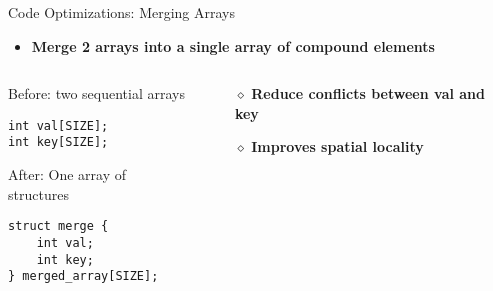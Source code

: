 \documentclass[aspectratio=169,12pt]{beamer}
\begin{document}
\begin{frame}[fragile]{Code Optimizations: Merging Arrays}
\begin{itemize}
  \item \textbf{Merge 2 arrays into a single array of compound elements}
\end{itemize}

\begin{columns}
\begin{column}{0.65\textwidth}
\begin{block}{Before: two sequential arrays}
\small
\begin{lstlisting}[basicstyle=\ttfamily\small, commentstyle=\color{red}]
int val[SIZE];
int key[SIZE];
\end{lstlisting}
\end{block}

\begin{block}{After: One array of structures}
\small
\begin{lstlisting}[basicstyle=\ttfamily\small, commentstyle=\color{green!60!black}]
struct merge {
    int val;
    int key;
} merged_array[SIZE];
\end{lstlisting}
\end{block}
\end{column}

\begin{column}{0.35\textwidth}
\begin{itemize}
  \item[$\diamond$] \textbf{Reduce conflicts between val and key}
  \item[$\diamond$] \textbf{Improves spatial locality}
\end{itemize}
\end{column}
\end{columns}
\end{frame}
\end{document}
